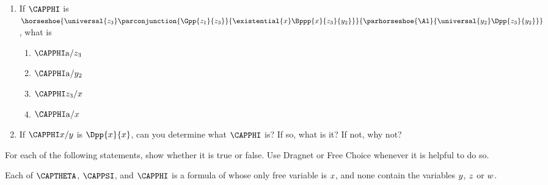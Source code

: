\begin{enumerate}
\item If $\CAPPHI$ is $\horseshoe{\universal{\variable{z_{\integer{3}}}}\parconjunction{\Gpp{\variable{z_{\integer{1}}}}{\variable{z_{\integer{3}}}}}{\existential{\variable{x}}\Bppp{\variable{x}}{\variable{z_{\integer{3}}}}{\variable{y_{\integer{2}}}}}}{\parhorseshoe{\Al}{\universal{\variable{y_{\integer{2}}}}\Dpp{\variable{z_{\integer{3}}}}{\variable{y_{\integer{2}}}}}}$, what is
\begin{enumerate}
\item $\CAPPHI\constant{a}/\variable{z_{\integer{3}}}$
\item $\CAPPHI\constant{a}/\variable{y_{\integer{2}}}$
\item $\CAPPHI\variable{z_{\integer{3}}}/\variable{x}$
\item $\CAPPHI\constant{a}/\variable{x}$
\end{enumerate} 
\item If $\CAPPHI\variable{x}/\variable{y}$ is $\Dpp{\variable{x}}{\variable{x}}$, can you determine what $\CAPPHI$ is? If so, what is it? If not, why not?
\end{enumerate}

 For each of the following statements, show whether it is true or false. 
Use Dragnet or Free Choice whenever it is helpful to do so.

Each of $\CAPTHETA$, $\CAPPSI$, and $\CAPPHI$ is a formula of \GQL{} whose only free variable is $x$, and none contain the variables $y$, $z$ or $w$. 

